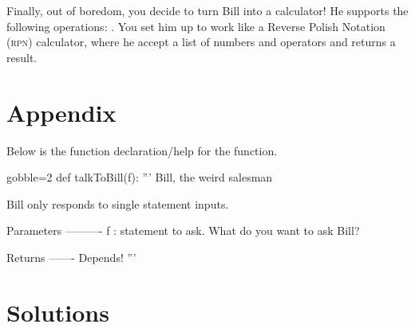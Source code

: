 \documentclass[10pt, letterpaper, acro-macros]{python-problem}
\begin{document}
Finally, out of boredom, you decide to turn Bill into a calculator! He
supports the following operations: \code{+, -, *, /}. You set him up to work
like a Reverse Polish Notation (\textsc{rpn}) calculator, where he accept a
list of numbers and operators and returns a result.


\section*{Appendix}

Below is the function declaration/help for the  function.

\begin{pycode*}{gobble=2}
  def talkToBill(f):
      ''' Bill, the weird salesman

      Bill only responds to single statement inputs.

      Parameters
      ----------
      f : statement to ask.
          What do you want to ask Bill?

      Returns
      -------
      Depends!
      '''
\end{pycode*}


\beginsolution

\section*{Solutions}
\end{document}
